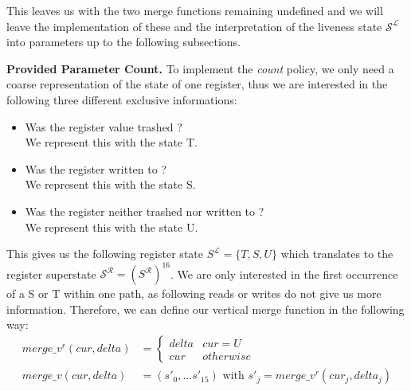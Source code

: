 This leaves us with the two merge functions remaining undefined and we will leave the implementation of these and the interpretation of 
the liveness state $\mathcal{S}^\mathcal{L}$ into parameters up to the following subsections.

%
%

\textbf{Provided Parameter Count.}
\label{subsection:providedparamcount}
To implement the \emph{count} policy, we only need a coarse representation of the state of one register, thus we are interested 
in the following three different exclusive informations:

\begin{itemize}
\item Was the register value trashed ? \\ We represent this with the state T.
\item Was the register written to ? \\ We represent this with the state S.
\item Was the register neither trashed nor written to ? \\ We represent this with the state U.
\end{itemize}
This gives us the following register state $S^\mathcal{L} = \{ T, S, U \}$ which translates to the register superstate $\mathcal{S}^\mathcal{R} = (S^\mathcal{R})^{16}$.
We are only interested in the first occurrence of a S or T within one path, as following reads or writes do not give us more information.
Therefore, we can define our vertical merge function in the following way:
\begin{align}
merge\_v^{r} (cur, delta) &= \left\{
  \begin{array}{lr}
     delta & cur = U \\
     cur & otherwise
  \end{array}
\right. \\
merge\_v (cur, delta) &= (s'_0, ... s'_15) \text { with } s'_j = merge\_v^{r}(cur_j, delta_j)
\end{align}


